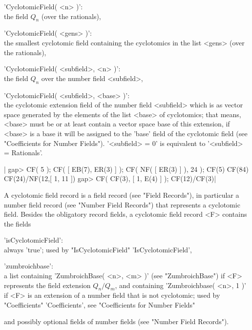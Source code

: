 'CyclotomicField( <n> )':\\
     the field $Q_n$ (over the rationals),

'CyclotomicField( <gens> )':\\
     the smallest cyclotomic field containing the cyclotomics in the list
     <gens> (over the rationals),

'CyclotomicField( <subfield>, <n> )':\\
     the field $Q_n$ over the number field <subfield>,

'CyclotomicField( <subfield>, <base> )':\\
     the cyclotomic extension field of the number field <subfield> which
     is as vector space generated by the elements of the list <base> of
     cyclotomics; that means, <base> must be or at least contain a vector
     space base of this extension, if <base> is a base it will be
     assigned to the 'base' field of the cyclotomic field
     (see "Coefficients for Number Fields").
     '<subfield> = 0' is equivalent to '<subfield> = Rationals'.

|    gap> CF( 5 ); CF( [ EB(7), ER(3) ] ); CF( NF( [ ER(3) ] ), 24 );
    CF(5)
    CF(84)
    CF(24)/NF(12,[ 1, 11 ])
    gap> CF( CF(3), [ 1, E(4) ] );
    CF(12)/CF(3)|

A cyclotomic field record is a field record (see "Field Records"), in
particular a number field record (see "Number Field Records") that
represents a cyclotomic field.  Besides the obligatory record fields,
a cyclotomic field record <F> contains the fields

'isCyclotomicField':\\
     always 'true'; used by "IsCyclotomicField" 'IsCyclotomicField',

'zumbroichbase':\\
     a list containing 'ZumbroichBase( <n>, <m> )' (see "ZumbroichBase")
     if <F> represents the
     field extension $Q_n/Q_m$, and containing 'Zumbroichbase( <n>, 1 )'
     if <F> is an extension of a number field that is not cyclotomic;
     used by "Coefficients" 'Coefficients', see "Coefficients for Number
     Fields"

and possibly optional fields of number fields (see "Number Field
Records").

%

